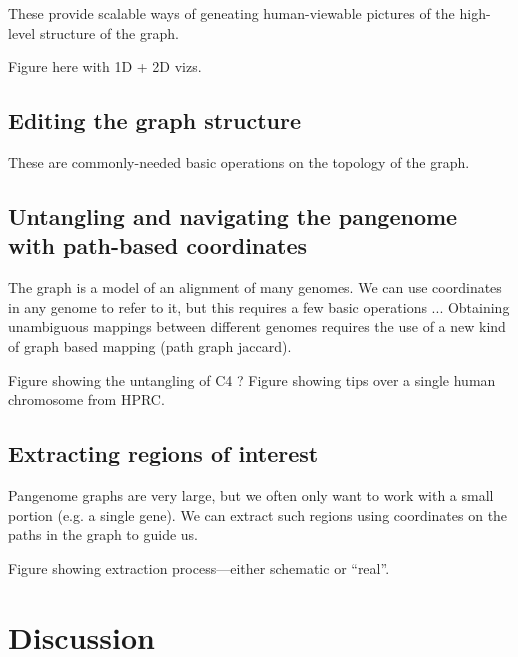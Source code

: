 \documentclass{bioinfo}
\begin{document}

These provide scalable ways of geneating human-viewable pictures of the high-level structure of the graph.

Figure here with 1D + 2D vizs.

\subsection{Editing the graph structure}


These are commonly-needed basic operations on the topology of the graph.

\subsection{Untangling and navigating the pangenome with path-based coordinates}


The graph is a model of an alignment of many genomes.
We can use coordinates in any genome to refer to it, but this requires a few basic operations ...
Obtaining unambiguous mappings between different genomes requires the use of a new kind of graph based mapping (path graph jaccard).

Figure showing the untangling of C4 ?
Figure showing tips over a single human chromosome from HPRC.

\subsection{Extracting regions of interest}


Pangenome graphs are very large, but we often only want to work with a small portion (e.g. a single gene).
We can extract such regions using coordinates on the paths in the graph to guide us.

Figure showing extraction process---either schematic or ``real''.

\section{Discussion}
\end{document}
